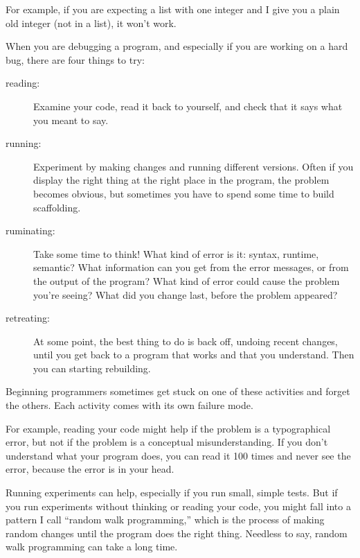 \documentclass[10pt]{book}
\begin{document}
For example, if you are expecting a list with one integer and I
give you a plain old integer (not in a list), it won't work.

When you are debugging a program, and especially if you are
working on a hard bug, there are four things to try:

\begin{description}

\item[reading:] Examine your code, read it back to yourself, and
check that it says what you meant to say.

\item[running:] Experiment by making changes and running different
versions.  Often if you display the right thing at the right place
in the program, the problem becomes obvious, but sometimes you have to
spend some time to build scaffolding.

\item[ruminating:] Take some time to think!  What kind of error
is it: syntax, runtime, semantic?  What information can you get from
the error messages, or from the output of the program?  What kind of
error could cause the problem you're seeing?  What did you change
last, before the problem appeared?

\item[retreating:] At some point, the best thing to do is back
off, undoing recent changes, until you get back to a program that
works and that you understand.  Then you can starting rebuilding.

\end{description}

Beginning programmers sometimes get stuck on one of these activities
and forget the others.  Each activity comes with its own failure
mode.


For example, reading your code might help if the problem is a
typographical error, but not if the problem is a conceptual
misunderstanding.  If you don't understand what your program does, you
can read it 100 times and never see the error, because the error is in
your head.


Running experiments can help, especially if you run small, simple
tests.  But if you run experiments without thinking or reading your
code, you might fall into a pattern I call ``random walk programming,''
which is the process of making random changes until the program
does the right thing.  Needless to say, random walk programming
can take a long time.
\end{document}
